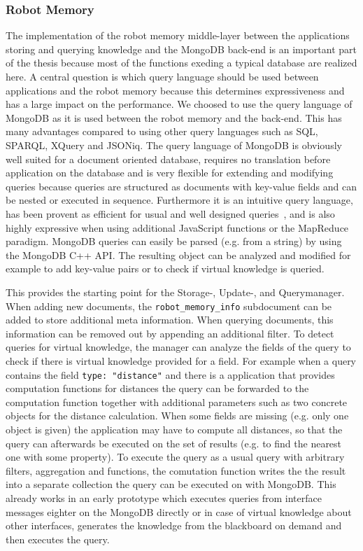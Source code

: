 \documentclass[a4paper,11pt]{article}
\begin{document}
\subsubsection{Robot Memory}
\label{sec:impl-memory}
The implementation of the robot memory middle-layer between the
applications storing and querying knowledge and the MongoDB back-end
is an important part of the thesis because most of the functions
exeding a typical database are realized here. A central question is
which query language should be used between applications and the robot
memory because this determines expressiveness and has a large impact
on the performance. We choosed to use the query language of MongoDB as
it is used between the robot memory and the back-end. This has many
advantages compared to using other query languages such as SQL,
SPARQL, XQuery and JSONiq. The query language of MongoDB is obviously
well suited for a document oriented database, requires no translation
before application on the database and is very flexible for extending
and modifying queries because queries are structured as documents with
key-value fields and can be nested or executed in
sequence. Furthermore it is an intuitive query language, has been
provent as efficient for usual and well designed
queries~\cite{mongodb,RoboDB}, and is also highly expressive when
using additional JavaScript functions or the MapReduce
paradigm. MongoDB queries can easily be parsed (e.g. from a string) by
using the MongoDB C++ API. The resulting object can be analyzed and
modified for example to add key-value pairs or to check if virtual
knowledge is queried.

This provides the starting point for the Storage-, Update-, and
Querymanager. When adding new documents, the
\texttt{robot\_memory\_info} subdocument can be added to store
additional meta information. When querying documents, this information
can be removed out by appending an additional filter. To detect
queries for virtual knowledge, the manager can analyze the fields of
the query to check if there is virtual knowledge provided for a
field. For example when a query contains the field \texttt{type:
  "distance"} and there is a application that provides computation
functions for distances the query can be forwarded to the computation
function together with additional parameters such as two concrete
objects for the distance calculation. When some fields are missing
(e.g. only one object is given) the application may have to compute
all distances, so that the query can afterwards be executed on the set
of results (e.g. to find the nearest one with some property). To
execute the query as a usual query with arbitrary filters, aggregation
and functions, the comutation function writes the the result into a
separate collection the query can be executed on with MongoDB. This
already works in an early prototype which executes queries from
interface messages eighter on the MongoDB directly or in case of
virtual knowledge about other interfaces, generates the knowledge from
the blackboard on demand and then executes the query.
\end{document}

